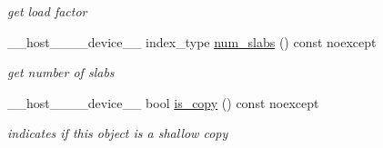 \begin{DoxyCompactItemize}
\begin{DoxyCompactList}\small\item\em get load factor \end{DoxyCompactList}\item 
\+\_\+\+\_\+host\+\_\+\+\_\+\+\_\+\+\_\+device\+\_\+\+\_\+ index\+\_\+type \hyperlink{classwarpcore_1_1storage_1_1multi__value_1_1StaticSlabListStore_ae6dc8b8e5b987be4d23154316be80ed2}{num\+\_\+slabs} () const noexcept
\begin{DoxyCompactList}\small\item\em get number of slabs \end{DoxyCompactList}\item 
\+\_\+\+\_\+host\+\_\+\+\_\+\+\_\+\+\_\+device\+\_\+\+\_\+ bool \hyperlink{classwarpcore_1_1storage_1_1multi__value_1_1StaticSlabListStore_a5c11beecaea31d78396f7d5746859911}{is\+\_\+copy} () const noexcept
\begin{DoxyCompactList}\small\item\em indicates if this object is a shallow copy \end{DoxyCompactList}\end{DoxyCompactItemize}
